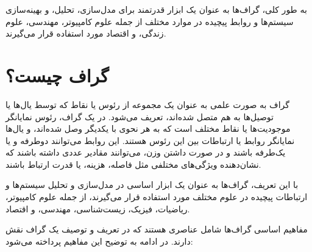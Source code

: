 \documentclass[a4paper,10pt]{book}
\begin{document}
        به طور کلی، گراف‌ها به عنوان یک ابزار قدرتمند برای مدل‌سازی، تحلیل، و بهینه‌سازی سیستم‌ها و روابط پیچیده در موارد مختلف از جمله علوم کامپیوتر، مهندسی، علوم زندگی، و اقتصاد مورد استفاده قرار می‌گیرند.

        \section{گراف چیست؟}

            گراف به صورت علمی به عنوان یک مجموعه از رئوس یا نقاط که توسط یال‌ها یا توصیل‌ها به هم متصل شده‌اند، تعریف می‌شود. در یک گراف، رئوس نمایانگر موجودیت‌ها یا نقاط مختلف است که به هر نحوی با یکدیگر وصل شده‌اند، و یال‌ها نمایانگر روابط یا ارتباطات بین این رئوس هستند. این روابط می‌توانند دوطرفه و یا یک‌طرفه باشند و در صورت داشتن وزن، می‌توانند مقادیر عددی داشته باشند که نشان‌دهنده ویژگی‌های مختلفی مثل فاصله، هزینه، یا قدرت ارتباط باشند.

            با این تعریف، گراف‌ها به عنوان یک ابزار اساسی در مدل‌سازی و تحلیل سیستم‌ها و ارتباطات پیچیده در علوم مختلف مورد استفاده قرار می‌گیرند، از جمله علوم کامپیوتر، ریاضیات، فیزیک، زیست‌شناسی، مهندسی، و اقتصاد.

            مفاهیم اساسی گراف‌ها شامل عناصری هستند که در تعریف و توصیف یک گراف نقش دارند. در ادامه به توضیح این مفاهیم پرداخته می‌شود:

\end{document}
